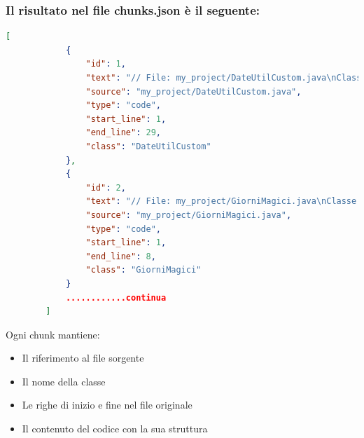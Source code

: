 \documentclass[12pt,a4paper,openright,twoside]{book}
\begin{document}
\subsubsection{Il risultato nel file chunks.json è il seguente:}
    \begin{lstlisting}[language=json,firstnumber=1, caption={Esempio di chunks generati}, label={lst:chunks-example}]
        [
            {
                "id": 1,
                "text": "// File: my_project/DateUtilCustom.java\nClasse: DateUtilCustom\npublic class DateUtilCustom {\n    public static String getMessaggioMagico(LocalDate datamagica) throws DateTimeParseException {\n        DayOfWeek giornoSettimana = datamagica.getDayOfWeek();\n        switch(giornoSettimana) {\n            case MONDAY: return \"La magia inizia nel silenzio...\";\n            case TUESDAY: return \"I sussurri degli antichi si fanno sentire.\";\n            case WEDNESDAY: return \"Il velo tra i mondi e' sottile oggi.\";\n            case THURSDAY: return \"L'energia magica e' potente e chiara.\";\n            case FRIDAY: return \"Attenzione agli incantesimi del crepuscolo.\";\n            case SATURDAY: return \"Il giorno perfetto per scoprire segreti nascosti.\";\n            case SUNDAY: return \"Riposa e rigenera il tuo potere magico.\";\n            default: return \"Il giorno e' avvolto nel mistero...\";\n        }\n    }\n}",
                "source": "my_project/DateUtilCustom.java",
                "type": "code",
                "start_line": 1,
                "end_line": 29,
                "class": "DateUtilCustom"
            },
            {
                "id": 2,
                "text": "// File: my_project/GiorniMagici.java\nClasse: GiorniMagici\npublic class GiorniMagici {\n    public static String segnaleWow(LocalDate data) {\n        String wow = \"il tuo segnale Wow e': \" + DateUtilCustom.getMessaggioMagico(date);\n        return wow;\n    }\n}",
                "source": "my_project/GiorniMagici.java",
                "type": "code",
                "start_line": 1,
                "end_line": 8,
                "class": "GiorniMagici"
            }
            ............continua
        ]
    \end{lstlisting}
        
    Ogni chunk mantiene:
    \begin{itemize}
        \item Il riferimento al file sorgente
        \item Il nome della classe
        \item Le righe di inizio e fine nel file originale
        \item Il contenuto del codice con la sua struttura
    \end{itemize}
\end{document}
